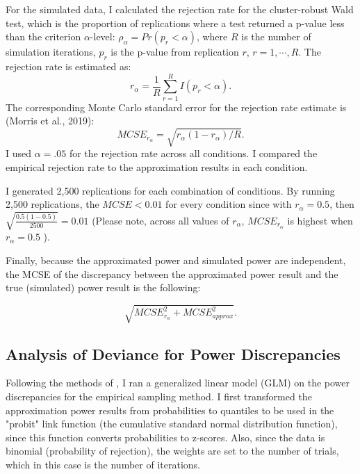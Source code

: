 For the simulated data, I calculated the rejection rate for the cluster-robust Wald test, which is the proportion of replications where a test returned a p-value less than the criterion $\alpha$-level: $\rho_{\alpha} = Pr(p_r < \alpha)$, where $R$ is the number of simulation iterations, $p_r$ is the p-value from replication $r$, $r = 1, \cdots, R$. The rejection rate is estimated as:
\begin{equation}
    r_{\alpha} = \frac{1}{R} \sum_{r=1}^R I(p_r < \alpha).
\end{equation}
The corresponding Monte Carlo standard error for the rejection rate estimate is (Morris et al., 2019):
\begin{equation}
    MCSE_{r_{\alpha}} = \sqrt{r_{\alpha}(1-r_{\alpha})/R}.
\end{equation}
I used $\alpha = .05$ for the rejection rate across all conditions. I compared the empirical rejection rate to the approximation results in each condition.

I generated 2,500 replications for each combination of conditions. By running 2,500 replications, the $MCSE < 0.01$ for every condition since with $r_{\alpha} = 0.5$, then $\sqrt{\frac{0.5(1-0.5)}{2500}} = 0.01$ (Please note, across all values of $r_{\alpha}$,  $ MCSE_{r_{\alpha}}$ is highest when $r_{\alpha} = 0.5$ ). 


Finally, because the approximated power and simulated power are independent, the MCSE of the discrepancy between the approximated power result and the true (simulated) power result is the following:

\begin{equation}
    \sqrt{MCSE_{r_{\alpha}}^2 + MCSE_{approx}^2}.
\end{equation}


\subsection{Analysis of Deviance for Power Discrepancies} \label{sec: analysis of deviance}

Following the methods of \textcite{vembye2023}, I ran a generalized linear model (GLM) on the power discrepancies for the empirical sampling method. I first transformed the approximation power results from probabilities to quantiles to be used in the "probit" link function (the cumulative standard normal distribution function), since this function converts probabilities to z-scores. Also, since the data is binomial (probability of rejection), the weights are set to the number of trials, which in this case is the number of iterations.  

